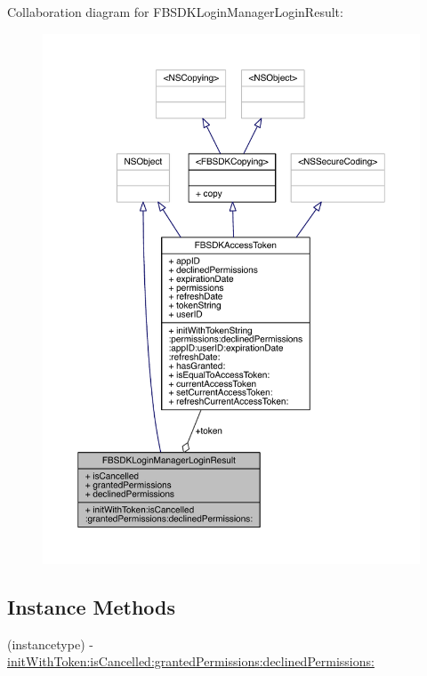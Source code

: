 Collaboration diagram for F\-B\-S\-D\-K\-Login\-Manager\-Login\-Result\-:
\nopagebreak
\begin{figure}[H]
\begin{center}
\leavevmode
\includegraphics[width=350pt]{interface_f_b_s_d_k_login_manager_login_result__coll__graph}
\end{center}
\end{figure}
\subsection*{Instance Methods}
\begin{DoxyCompactItemize}
\item 
(instancetype) -\/ \hyperlink{interface_f_b_s_d_k_login_manager_login_result_ac5a7c56d925a9b7e0f2956d56d0bf7d3}{init\-With\-Token\-:is\-Cancelled\-:granted\-Permissions\-:declined\-Permissions\-:}
\end{DoxyCompactItemize}

